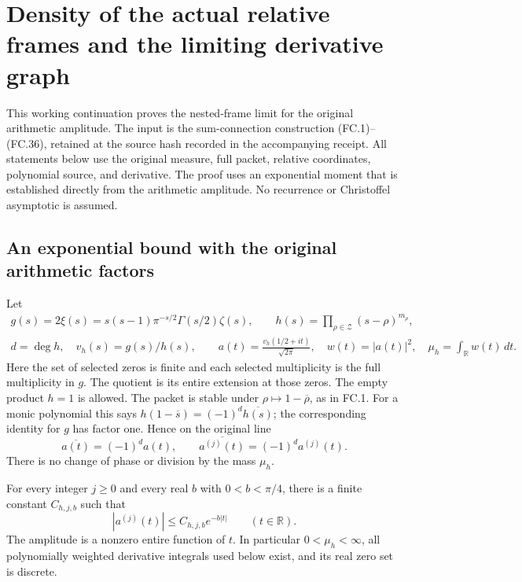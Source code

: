 \section{Density of the actual relative frames and the limiting derivative graph}
\label{sec:nested-relative-frame-density}

This working continuation proves the nested-frame limit for the original
arithmetic amplitude. The input is the sum-connection construction
(FC.1)--(FC.36), retained at the source hash recorded in the accompanying
receipt. All statements below use the original measure, full packet,
relative coordinates, polynomial source, and derivative. The proof uses
an exponential moment that is established directly from the arithmetic
amplitude. No recurrence or Christoffel asymptotic is assumed.

\subsection{An exponential bound with the original arithmetic factors}

Let
\[
 \begin{gathered}
 g(s)=2\xi(s)=s(s-1)\pi^{-s/2}\Gamma(s/2)\zeta(s),\qquad
 h(s)=\prod_{\rho\in\mathcal Z}(s-\rho)^{m_\rho},\\
 d=\deg h,\quad v_h(s)=g(s)/h(s),\qquad
 a(t)=\frac{v_h(1/2+it)}{\sqrt{2\pi}},\quad
 w(t)=|a(t)|^2,\quad \mu_h=\int_{\mathbb R}w(t)\,dt.
 \end{gathered}
 \tag{ND.1}
\]
Here the set of selected zeros is finite and each selected multiplicity
is the full multiplicity in \(g\). The quotient is its entire extension
at those zeros. The empty product \(h=1\) is allowed. The packet is
stable under \(\rho\mapsto1-\overline\rho\), as in FC.1. For a
monic polynomial this says
\(h(1-\overline s)=(-1)^d\overline{h(s)}\); the corresponding
identity for \(g\) has factor one. Hence on the original line
\[
 \overline{a(t)}=(-1)^d a(t),\qquad
 \overline{a^{(j)}(t)}=(-1)^d a^{(j)}(t).
 \tag{ND.2}
\]
There is no change of phase or division by the mass \(\mu_h\).

\begin{theorem}
For every integer \(j\ge0\) and every real \(b\) with
\(0<b<\pi/4\), there is a finite constant \(C_{h,j,b}\) such that
\[
 |a^{(j)}(t)|\le C_{h,j,b}e^{-b|t|}\qquad(t\in\mathbb R).
 \tag{ND.3}
\]
The amplitude is a nonzero entire function of \(t\). In particular
\(0<\mu_h<\infty\), all polynomially weighted derivative integrals
used below exist, and its real zero set is discrete.
\end{theorem}

